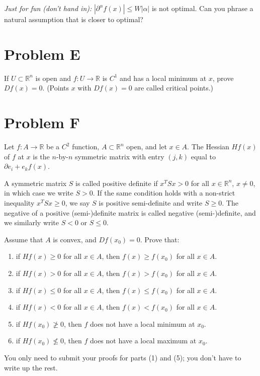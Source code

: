 \documentclass[lang=en,11pt]{template}
\begin{document}
\textit{Just for fun (don’t hand in):} $|\partial^\alpha f(x)| \leq W |\alpha|$ is not optimal. Can you phrase a natural assumption that is closer to optimal?

\section*{Problem E}
If $U \subset \mathbb{R}^n$ is open and $f : U \to \mathbb{R}$ is $C^1$ and has a local minimum at $x$, prove $Df(x) = 0$. (Points $x$ with $Df(x) = 0$ are called critical points.)

\section*{Problem F}
Let $f : A \to \mathbb{R}$ be a $C^2$ function, $A \subset \mathbb{R}^n$ open, and let $x \in A$. The Hessian $Hf(x)$ of $f$ at $x$ is the $n$-by-$n$ symmetric matrix with entry $(j, k)$ equal to $\partial e_i + e_k f(x)$.

A symmetric matrix $S$ is called positive definite if $x^T S x > 0$ for all $x \in \mathbb{R}^n$, $x \neq 0$, in which case we write $S > 0$. If the same condition holds with a non-strict inequality $x^T S x \geq 0$, we say $S$ is positive semi-definite and write $S \geq 0$. The negative of a positive (semi-)definite matrix is called negative (semi-)definite, and we similarly write $S < 0$ or $S \leq 0$.

Assume that $A$ is convex, and $Df(x_0) = 0$. Prove that:
\begin{enumerate}
    \item if $Hf(x) \geq 0$ for all $x \in A$, then $f(x) \geq f(x_0)$ for all $x \in A$.
    \item if $Hf(x) > 0$ for all $x \in A$, then $f(x) > f(x_0)$ for all $x \in A$.
    \item if $Hf(x) \leq 0$ for all $x \in A$, then $f(x) \leq f(x_0)$ for all $x \in A$.
    \item if $Hf(x) < 0$ for all $x \in A$, then $f(x) < f(x_0)$ for all $x \in A$.
    \item if $Hf(x_0) \not\geq 0$, then $f$ does not have a local minimum at $x_0$.
    \item if $Hf(x_0) \not\leq 0$, then $f$ does not have a local maximum at $x_0$.
\end{enumerate}

You only need to submit your proofs for parts (1) and (5); you don’t have to write up the rest.
\end{document}
